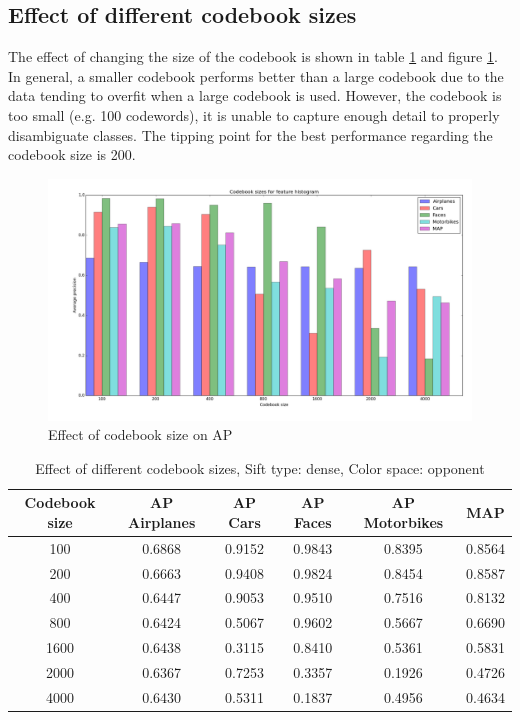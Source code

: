 \subsection{Effect of different codebook sizes}
The effect of changing the size of the codebook is shown in table \ref{tab:clusters} and figure \ref{plot:codebook}. In general, a smaller codebook performs better than a large codebook due to the data tending to overfit when a large codebook is used. However, the codebook is too small (e.g. 100 codewords), it is unable to capture enough detail to properly disambiguate classes. The tipping point for the best performance regarding the codebook size is 200.

\begin{figure}[H]
\includegraphics[width=\textwidth]{../plots/cluster_size_feature_histograms}
\caption{Effect of codebook size on AP}
\label{plot:codebook}
\end{figure}
\begin{table}[H]
\begin{tabular}{|c|ccccc|}
\hline
\textbf{Codebook size} & \textbf{AP Airplanes} & \textbf{AP Cars} & \textbf{AP Faces} & \textbf{AP Motorbikes} & \textbf{MAP}\\
\hline
100& 0.6868 & 0.9152 & 0.9843 & 0.8395 & 0.8564\\
200 & 0.6663 & 0.9408 & 0.9824 & 0.8454 & 0.8587\\
400 & 0.6447 & 0.9053 & 0.9510 & 0.7516 & 0.8132\\
800 & 0.6424 & 0.5067 & 0.9602 & 0.5667 & 0.6690\\
1600 & 0.6438 & 0.3115 & 0.8410 & 0.5361 & 0.5831\\
2000 & 0.6367 & 0.7253 & 0.3357 & 0.1926 & 0.4726\\
4000 & 0.6430 & 0.5311 & 0.1837 & 0.4956 & 0.4634\\
\hline
\end{tabular}
\caption{Effect of different codebook sizes, Sift type: dense, Color space: opponent}
\label{tab:clusters}
\end{table}
